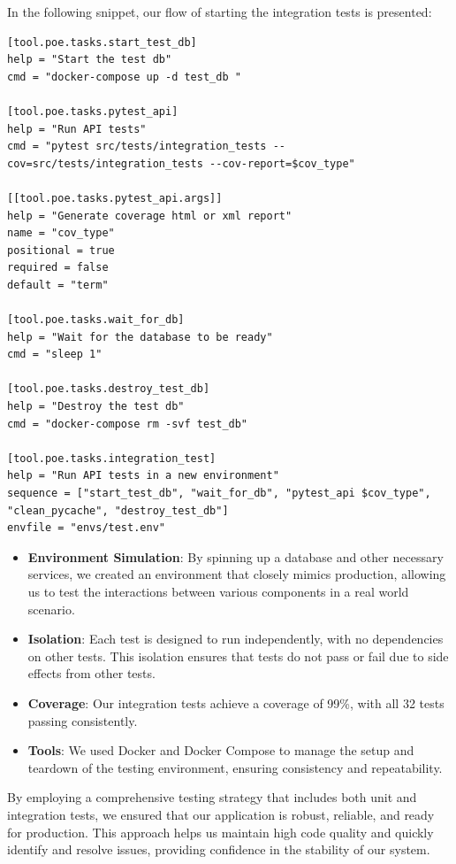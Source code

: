 In the following snippet, our flow of starting the integration tests is presented:
\begin{lstlisting}
[tool.poe.tasks.start_test_db]
help = "Start the test db"
cmd = "docker-compose up -d test_db "

[tool.poe.tasks.pytest_api]
help = "Run API tests"
cmd = "pytest src/tests/integration_tests --cov=src/tests/integration_tests --cov-report=$cov_type"

[[tool.poe.tasks.pytest_api.args]]
help = "Generate coverage html or xml report"
name = "cov_type"
positional = true
required = false
default = "term"

[tool.poe.tasks.wait_for_db]
help = "Wait for the database to be ready"
cmd = "sleep 1"

[tool.poe.tasks.destroy_test_db]
help = "Destroy the test db"
cmd = "docker-compose rm -svf test_db"

[tool.poe.tasks.integration_test]
help = "Run API tests in a new environment"
sequence = ["start_test_db", "wait_for_db", "pytest_api $cov_type", "clean_pycache", "destroy_test_db"]
envfile = "envs/test.env"
\end{lstlisting}

\begin{itemize}
    \item \textbf{Environment Simulation}: By spinning up a database and other necessary services, we created an environment that closely mimics production, allowing us to test the interactions between various components in a real world scenario.
    \item \textbf{Isolation}: Each test is designed to run independently, with no dependencies on other tests. This isolation ensures that tests do not pass or fail due to side effects from other tests.
    \item \textbf{Coverage}: Our integration tests achieve a coverage of 99\%, with all 32 tests passing consistently.
    \item \textbf{Tools}: We used Docker and Docker Compose to manage the setup and teardown of the testing environment, ensuring consistency and repeatability.
\end{itemize}

By employing a comprehensive testing strategy that includes both unit and integration tests, we ensured that our application is robust, reliable, and ready for production. This approach helps us maintain high code quality and quickly identify and resolve issues, providing confidence in the stability of our system.

